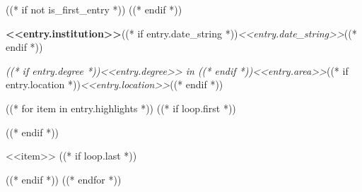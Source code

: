 ((* if not is_first_entry *))
\vspace{<<design.margins.entry_area.vertical_between>>}
((* endif *))

\begin{onecolentry}
    \textbf{<<entry.institution>>}((* if entry.date_string *))\hfill \textit{<<entry.date_string>>}((* endif *))\par
    \textit{((* if entry.degree *))<<entry.degree>> in ((* endif *))<<entry.area>>}((* if entry.location *))\hfill \textit{<<entry.location>>}((* endif *))
\end{onecolentry}

((* for item in entry.highlights *))
    ((* if loop.first *))
\vspace{<<design.margins.highlights_area.top>>}
\begin{onecolentry}
    \begin{highlights}
    ((* endif *))
        \item <<item>>
    ((* if loop.last *))
    \end{highlights}
\end{onecolentry}
    ((* endif *))
((* endfor *))
